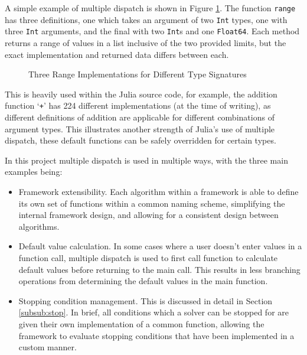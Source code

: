 A simple example of multiple dispatch is shown in Figure \ref{fig:julia_md_demo}. The function \texttt{range} has three definitions, one which takes an argument of two \texttt{Int} types, one with three \texttt{Int} arguments, and the final with two \texttt{Int}s and one \texttt{Float64}. Each method returns a range of values in a list inclusive of the two provided limits, but the exact implementation and returned data differs between each.

\begin{figure}[t]
    \centering
    
    \caption{Three Range Implementations for Different Type Signatures}
    \label{fig:julia_md_demo}
\end{figure}

This is heavily used within the Julia source code, for example, the addition function `\texttt{+}'  has 224 different implementations (at the time of writing), as different definitions of addition are applicable for different combinations of argument types. This  illustrates another strength of Julia's use of multiple dispatch, these default functions can be safely overridden for certain types. 

In this project multiple dispatch is used in multiple ways, with the three main examples being:
\begin{itemize}
    \item Framework extensibility. Each algorithm within a framework is able to define its own set of functions within a common naming scheme, simplifying the internal framework design, and allowing for a consistent design between algorithms.
    \item Default value calculation. In some cases where a user doesn't enter values in a function call, multiple dispatch is used to first call function to calculate default values before returning to the main call. This results in less branching operations from determining the default values in the main function.
    \item Stopping condition management. This is discussed in detail in Section \ref{subsub:stop}. In brief, all conditions which a solver can be stopped for are given their own implementation of a common function, allowing the framework to evaluate stopping conditions that have been implemented in a custom manner.
\end{itemize}


